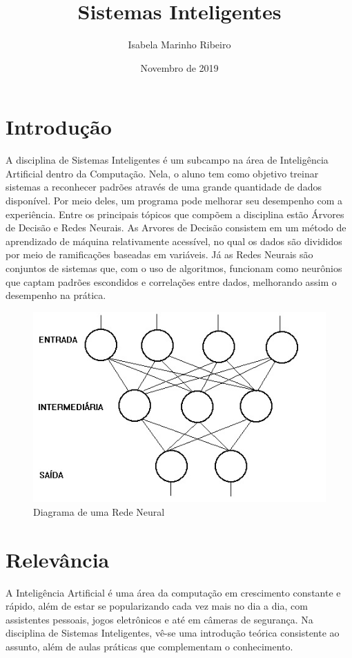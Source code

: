 \documentclass{article}
\title{Sistemas Inteligentes}
\author{Isabela Marinho Ribeiro }
\date{Novembro de 2019}
\begin{document}
\maketitle

\section{Introdução}
\label{drive}
\label{cadeira}
\label{arvore}
A disciplina de Sistemas Inteligentes é um subcampo na área de Inteligência Artificial dentro da Computação. \cite{drive} Nela, o aluno tem como objetivo treinar sistemas a reconhecer padrões através de uma grande quantidade de dados disponível. Por meio deles, um programa pode melhorar seu desempenho com a experiência. \cite{cadeira} Entre os principais tópicos que compõem a disciplina estão Árvores de Decisão e Redes Neurais. \cite{arvore} As Arvores de Decisão consistem em um método de aprendizado de máquina relativamente acessível, no qual os dados são divididos por meio de ramificações baseadas em variáveis. Já as Redes Neurais são conjuntos de sistemas que, com o uso de algoritmos, funcionam como neurônios que captam padrões escondidos e correlações entre dados, melhorando assim o desempenho na prática.

\begin{figure}[h!]
\centering
\includegraphics[scale=0.6]{redes.jpg}
\caption{\cite{1} Diagrama de uma Rede Neural}
\label{fig:redes.jpg}
\end{figure}

\section{Relevância}
A Inteligência Artificial é uma área da computação em crescimento constante e rápido, além de estar se popularizando cada vez mais no dia a dia, com assistentes pessoais, jogos eletrônicos e até em câmeras de segurança. Na disciplina de Sistemas Inteligentes, vê-se uma introdução teórica consistente ao assunto, além de aulas práticas que complementam o conhecimento.
\end{document}
